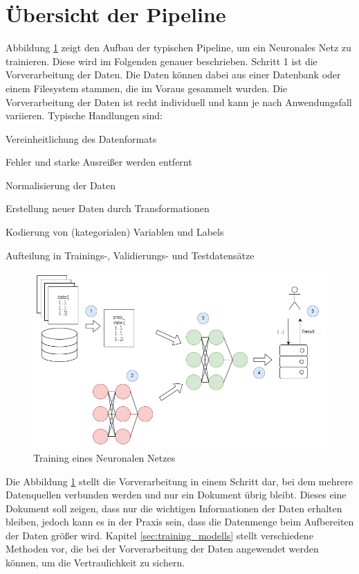 \section{Übersicht der Pipeline}


Abbildung \ref{fig:ml_pipeline} zeigt den Aufbau der typischen Pipeline, um ein Neuronales Netz zu trainieren. 
Diese wird im Folgenden genauer beschrieben.
Schritt 1 ist die Vorverarbeitung der Daten.
Die Daten können dabei aus einer Datenbank oder einem Filesystem stammen, die im Voraus gesammelt wurden.
Die Vorverarbeitung der Daten ist recht individuell und kann je nach Anwendungsfall variieren. 
Typische Handlungen sind:
\begin{compactitem}
\item Vereinheitlichung des Datenformats
\item Fehler und starke Ausreißer werden entfernt
\item Normalisierung der Daten
\item Erstellung neuer Daten durch Transformationen
\item Kodierung von (kategorialen) Variablen und Labels
\item Aufteilung in Trainings-, Validierungs- und Testdatensätze
\end{compactitem}
\begin{figure}[!htb]
    \centering
    \includegraphics[width=14cm]{figures/ml_pipeline.png}
    \caption{Training eines Neuronalen Netzes}
    \label{fig:ml_pipeline}
\end{figure} 

Die Abbildung \ref{fig:ml_pipeline} stellt die Vorverarbeitung in einem Schritt dar, bei dem mehrere Datenquellen verbunden werden und nur ein Dokument übrig bleibt. 
Dieses eine Dokument soll zeigen, dass nur die wichtigen Informationen der Daten erhalten bleiben, jedoch kann es in der Praxis sein, dass die Datenmenge beim Aufbereiten der Daten größer wird. 
Kapitel \ref{sec:training_modells} stellt verschiedene Methoden vor, die bei der Vorverarbeitung der Daten angewendet werden können, um die Vertraulichkeit zu sichern.

